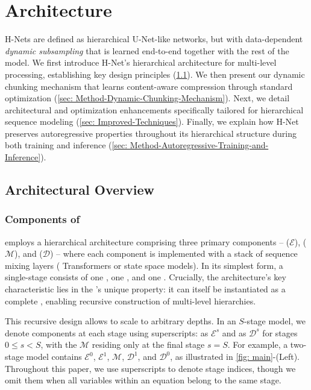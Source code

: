 

\section{\model{} Architecture}
\label{sec: method}

H-Nets are defined as hierarchical U-Net-like networks, but with data-dependent \emph{dynamic subsampling} that is learned end-to-end together with the rest of the model.
We first introduce H-Net's hierarchical architecture for multi-level processing, establishing key design principles (\cref{sec: Method-Architectural-Overview}).
We then present our dynamic chunking mechanism that learns content-aware compression through standard optimization (\cref{sec: Method-Dynamic-Chunking-Mechanism}).
Next, we detail architectural and optimization enhancements specifically tailored for hierarchical sequence modeling (\cref{sec: Improved-Techniques}).
Finally, we explain how H-Net preserves autoregressive properties throughout its hierarchical structure during both training and inference (\cref{sec: Method-Autoregressive-Training-and-Inference}).

\subsection{Architectural Overview}
\label{sec: Method-Architectural-Overview}

\subsubsection{Components of \model{}}

\model{} employs a hierarchical architecture comprising three primary components --  ($\mathcal{E}$), \main{} ($\mathcal{M}$), and  ($\mathcal{D}$)  -- where each component is implemented with a stack of sequence mixing layers (\eg{} Transformers or state space models).
In its simplest form, a single-stage \model{} consists of one \encoder{}, one \main{}, and one \decoder{}.
Crucially, the architecture's key characteristic lies in the \main{}'s unique property: it can itself be instantiated as a complete \model{}, enabling recursive construction of multi-level hierarchies.

This recursive design allows \model{} to scale to arbitrary depths.
In an $S$-stage model, we denote components at each stage using superscripts:  as $\mathcal{E}^s$ and  as $\mathcal{D}^s$ for stages $0 \leq s < S$, with the \main{} $\mathcal{M}$ residing only at the final stage $s=S$.
For example, a two-stage model contains $\mathcal{E}^0$, $\mathcal{E}^1$, $\mathcal{M}$, $\mathcal{D}^1$, and $\mathcal{D}^0$, as illustrated in \cref{fig: main}-(Left).
Throughout this paper, we use superscripts to denote stage indices, though we omit them when all variables within an equation belong to the same stage.

